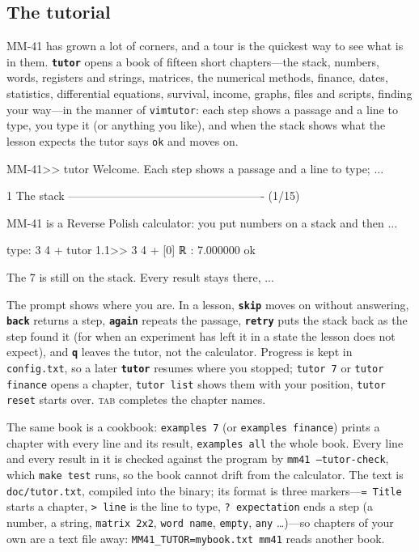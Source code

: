 \documentclass[11pt,letterpaper]{article}
\newcommand{\code}[1]{\texttt{#1}}
\newcommand{\cmd}[1]{\texttt{\textbf{#1}}}
\begin{document}
\subsection{The tutorial}
\label{sec:tutor}

MM-41 has grown a lot of corners, and a tour is the quickest way to see what is in them. \cmd{tutor} opens a book of fifteen short chapters---the stack, numbers, words, registers and strings, matrices, the numerical methods, finance, dates, statistics, differential equations, survival, income, graphs, files and scripts, finding your way---in the manner of \code{vimtutor}: each step shows a passage and a line to type, you type it (or anything you like), and when the stack shows what the lesson expects the tutor says \code{ok} and moves on.
\begin{rpn}
MM-41>> tutor
  Welcome. Each step shows a passage and a line to type; ...

1  The stack  ----------------------------------------------------  (1/15)

MM-41 is a Reverse Polish calculator: you put numbers on a stack and then ...

  type:  3 4 +
tutor 1.1>> 3 4 +
[0] ℝ : 7.000000
  ok

The 7 is still on the stack. Every result stays there, ...
\end{rpn}
The prompt shows where you are. In a lesson, \cmd{skip} moves on without answering, \cmd{back} returns a step, \cmd{again} repeats the passage, \cmd{retry} puts the stack back as the step found it (for when an experiment has left it in a state the lesson does not expect), and \cmd{q} leaves the tutor, not the calculator. Progress is kept in \code{config.txt}, so a later \cmd{tutor} resumes where you stopped; \code{tutor 7} or \code{tutor finance} opens a chapter, \code{tutor list} shows them with your position, \code{tutor reset} starts over. \textsc{tab} completes the chapter names.

The same book is a cookbook: \code{examples 7} (or \code{examples finance}) prints a chapter with every line and its result, \code{examples all} the whole book. Every line and every result in it is checked against the program by \code{mm41 --tutor-check}, which \code{make test} runs, so the book cannot drift from the calculator. The text is \code{doc/tutor.txt}, compiled into the binary; its format is three markers---\code{= Title} starts a chapter, \code{> line} is the line to type, \code{? expectation} ends a step (a number, a string, \code{matrix 2x2}, \code{word name}, \code{empty}, \code{any} \ldots)---so chapters of your own are a text file away: \code{MM41\_TUTOR=mybook.txt mm41} reads another book.
\end{document}
